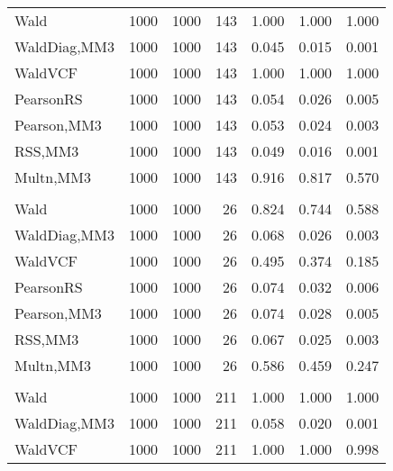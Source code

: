 \documentclass[
]{article}
\begin{document}
\begin{table}[H]
{\begin{tabular}[t]{lrrrrrr}
\hspace{1em}Wald & 1000 & 1000 & 143 & 1.000 & 1.000 & 1.000\\
\hspace{1em}WaldDiag,MM3 & 1000 & 1000 & 143 & 0.045 & 0.015 & 0.001\\
\hspace{1em}WaldVCF & 1000 & 1000 & 143 & 1.000 & 1.000 & 1.000\\
\hspace{1em}PearsonRS & 1000 & 1000 & 143 & 0.054 & 0.026 & 0.005\\
\hspace{1em}Pearson,MM3 & 1000 & 1000 & 143 & 0.053 & 0.024 & 0.003\\
\hspace{1em}RSS,MM3 & 1000 & 1000 & 143 & 0.049 & 0.016 & 0.001\\
\hspace{1em}Multn,MM3 & 1000 & 1000 & 143 & 0.916 & 0.817 & 0.570\\
\addlinespace[0.3em]
\multicolumn{7}{l}{\textbf{2F 10V}}\\
\hspace{1em}Wald & 1000 & 1000 & 26 & 0.824 & 0.744 & 0.588\\
\hspace{1em}WaldDiag,MM3 & 1000 & 1000 & 26 & 0.068 & 0.026 & 0.003\\
\hspace{1em}WaldVCF & 1000 & 1000 & 26 & 0.495 & 0.374 & 0.185\\
\hspace{1em}PearsonRS & 1000 & 1000 & 26 & 0.074 & 0.032 & 0.006\\
\hspace{1em}Pearson,MM3 & 1000 & 1000 & 26 & 0.074 & 0.028 & 0.005\\
\hspace{1em}RSS,MM3 & 1000 & 1000 & 26 & 0.067 & 0.025 & 0.003\\
\hspace{1em}Multn,MM3 & 1000 & 1000 & 26 & 0.586 & 0.459 & 0.247\\
\addlinespace[0.3em]
\multicolumn{7}{l}{\textbf{3F 15V}}\\
\hspace{1em}Wald & 1000 & 1000 & 211 & 1.000 & 1.000 & 1.000\\
\hspace{1em}WaldDiag,MM3 & 1000 & 1000 & 211 & 0.058 & 0.020 & 0.001\\
\hspace{1em}WaldVCF & 1000 & 1000 & 211 & 1.000 & 1.000 & 0.998\\

\end{tabular}}
\end{table}
\end{document}
